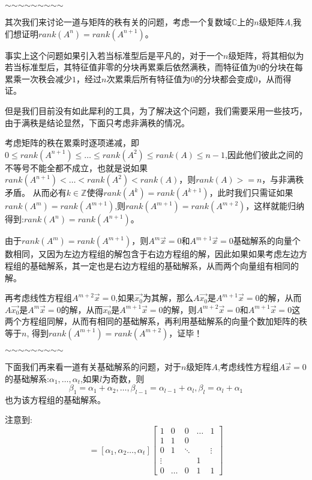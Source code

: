 \documentclass[a4paper,12pt]{ctexart}
\newenvironment{prooff}{{\noindent\it\textcolor{cyan!40!black}{Proof}:}\quad}{\par}
\begin{document}
\noindent\hfil$\sim$\hfil$\sim$\hfil$\sim$\hfil$\sim$\hfil$\sim$\hfil$\sim$\hfil$\sim$\hfil$\sim$\hfil$\sim$\hfil

其次我们来讨论一道与矩阵的秩有关的问题，考虑一个复数域$\mathbb{C}$上的$n$级矩阵$A$,我们想证明$rank(A^n)=rank(A^{n+1})$。

\begin{prooff}
    事实上这个问题如果引入若当标准型后是平凡的，对于一个$n$级矩阵，将其相似为若当标准型后，其特征值非零的分块再累乘后依然满秩，而特征值为$0$的分块在每累乘一次秩会减少$1$，经过$n$次累乘后所有特征值为$0$的分块都会变成$0$，从而得证。

    但是我们目前没有如此犀利的工具，为了解决这个问题，我们需要采用一些技巧，由于满秩是结论显然，下面只考虑非满秩的情况。

    考虑矩阵的秩在累乘时逐项递减，即$0\le rank(A^{n+1})\le \dots \le rank(A^2)\le rank(A)\le n-1 $,因此他们彼此之间的不等号不能全都不成立，也就是说如果$rank(A^{n+1})<\dots < rank(A^2)< rank(A) $，则$rank(A)>=n$，与非满秩矛盾。
    从而必有$k\in\mathbb{Z}$使得$rank(A^k)=rank(A^{k+1})$，此时我们只需证如果$rank(A^m)=rank(A^{m+1})$,则$rank(A^{m+1})=rank(A^{m+2})$，这样就能归纳得到:$rank(A^n)=rank(A^{n+1})$。

    由于$rank(A^m)=rank(A^{m+1})$，则$A^{m}\vec{x}=0$和$A^{m+1}\vec{x}=0$基础解系的向量个数相同，又因为左边方程组的解包含于右边方程组的解，因此如果如果考虑左边方程组的基础解系，其一定也是右边方程组的基础解系，从而两个向量组有相同的解。

    再考虑线性方程组$A^{m+2}\vec{x}=0$,如果$\vec{x_0}$为其解，那么$A\vec{x_0}$是$A^{m+1}\vec{x}=0$的解，从而$A\vec{x_0}$是$A^{m}\vec{x}=0$的解，从而$\vec{x_0}$是$A^{m+1}\vec{x}=0$的解，则$A^{m+2}\vec{x}=0$和$A^{m+1}\vec{x}=0$这两个方程组同解，从而有相同的基础解系，再利用基础解系的向量个数加矩阵的秩等于$n$,
    得到$rank(A^{m+1})=rank(A^{m+2})$，证毕！
\end{prooff}

\noindent\hfil$\sim$\hfil$\sim$\hfil$\sim$\hfil$\sim$\hfil$\sim$\hfil$\sim$\hfil$\sim$\hfil$\sim$\hfil$\sim$\hfil

下面我们再来看一道有关基础解系的问题，对于$n$级矩阵$A$,考虑线性方程组$A\vec{x}=0$的基础解系:$\alpha_1,\dots,\alpha_t$,如果$l$为奇数，则
\begin{equation*}
    \beta_1=\alpha_1+\alpha_2,\dots ,\beta_{l-1}=\alpha_{l-1}+\alpha_l,\beta_l=\alpha_l+\alpha_1
\end{equation*}
也为该方程组的基础解系。

注意到:
\begin{equation*}
    [\beta_1,\beta_2,\dots,\beta_t] =[\alpha_1,\alpha_2\dots,\alpha_t]\begin{bmatrix}
        1      & 0     & 0      & \dots & 1      \\
        1      & 1     & 0      &       &        \\
        0      & 1     & \ddots &       & \vdots \\
        \vdots &       &        & 1     &        \\
        0      & \dots & 0      & 1     & 1
    \end{bmatrix}
\end{equation*}
\end{document}
